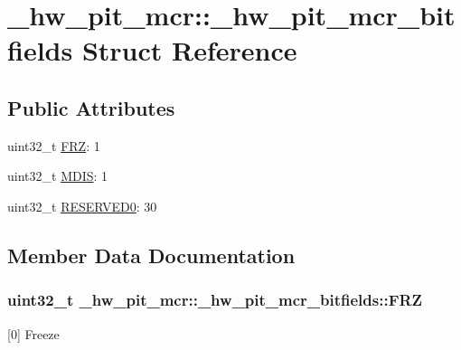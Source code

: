 \hypertarget{struct__hw__pit__mcr_1_1__hw__pit__mcr__bitfields}{}\section{\+\_\+hw\+\_\+pit\+\_\+mcr\+:\+:\+\_\+hw\+\_\+pit\+\_\+mcr\+\_\+bitfields Struct Reference}
\label{struct__hw__pit__mcr_1_1__hw__pit__mcr__bitfields}
\subsection*{Public Attributes}
\begin{DoxyCompactItemize}
\item 
uint32\+\_\+t \hyperlink{struct__hw__pit__mcr_1_1__hw__pit__mcr__bitfields_a4c6071f9d0d35e2086ac341040daacf0}{F\+RZ}\+: 1
\item 
uint32\+\_\+t \hyperlink{struct__hw__pit__mcr_1_1__hw__pit__mcr__bitfields_a01a3e4b24e739a93559063480625821c}{M\+D\+IS}\+: 1
\item 
uint32\+\_\+t \hyperlink{struct__hw__pit__mcr_1_1__hw__pit__mcr__bitfields_ad4ae1856cd1e546f5f5f9f5885afa808}{R\+E\+S\+E\+R\+V\+E\+D0}\+: 30
\end{DoxyCompactItemize}


\subsection{Member Data Documentation}
\subsubsection[{\texorpdfstring{F\+RZ}{FRZ}}]{\setlength{\rightskip}{0pt plus 5cm}uint32\+\_\+t \+\_\+hw\+\_\+pit\+\_\+mcr\+::\+\_\+hw\+\_\+pit\+\_\+mcr\+\_\+bitfields\+::\+F\+RZ}\hypertarget{struct__hw__pit__mcr_1_1__hw__pit__mcr__bitfields_a4c6071f9d0d35e2086ac341040daacf0}{}\label{struct__hw__pit__mcr_1_1__hw__pit__mcr__bitfields_a4c6071f9d0d35e2086ac341040daacf0}
\mbox{[}0\mbox{]} Freeze 
